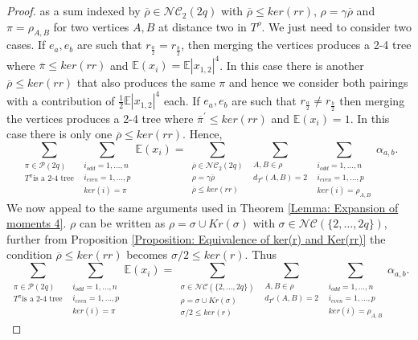 \documentclass{article}
\theoremstyle{definition}
\newcommand{\E}{\mathbb{E}}
\newcommand{\cP}{\mathcal{P}}
\newcommand{\NC}{\mathcal{NC}}
\begin{document}
{\begin{proof}
as a sum indexed by $\overline{\rho}\in \NC_2(2q)$ with $\overline{\rho}\leq ker(rr)$, $\rho=\gamma\overline{\rho}$ and $\pi=\rho_{A,B}$ for two vertices $A,B$ at distance two in $T^\rho$. We just need to consider two cases. If $e_a,e_b$ are such that $r_{\frac{a}{2}}=r_{\frac{b}{2}}$, then merging the vertices produces a 2-4 tree where $\overline{\pi}\leq ker(rr)$ and $\E(x_i)=\E|x_{1,2}|^4$. In this case there is another $\overline{\rho} \leq ker(rr)$ that also produces the same $\pi$ and hence we consider both pairings with a contribution of $\frac{1}{2}\E|x_{1,2}|^4$ each. If $e_a,e_b$ are such that $r_{\frac{a}{2}} \neq r_{\frac{b}{2}}$ then merging the vertices produces a 2-4 tree where $\overline{\pi}^\prime \leq ker(rr)$ and $\E(x_i)=1$. In this case there is only one $\overline{\rho} \leq ker(rr)$. Hence,
\begin{equation*}
\sum_{\substack{\pi\in \cP(2q)\\ T^\pi \text{is a 2-4 tree} }}\sum_{\substack{i_{odd}=1,\dots,n \\ i_{even}=1,\dots,p \\ ker(i)=\pi}}\E(x_i)= \sum_{\substack{\overline{\rho}\in \NC_2(2q) \\ \rho=\gamma\overline{\rho} \\ \overline{\rho}\leq ker(rr)}}\sum_{\substack{A,B\in\rho \\ d_{T^\rho}(A,B)=2}}\sum_{\substack{i_{odd}=1,\dots,n \\ i_{even}=1,\dots,p \\ ker(i)=\rho_{A,B}}}\alpha_{a,b}.
\end{equation*}
We now appeal to the same arguments used in Theorem \ref{Lemma: Expansion of moments 4}. $\rho$ can be written as $\rho=\sigma\cup Kr(\sigma)$ with $\sigma\in \NC(\{2,\dots,2q\})$, further from Proposition \ref{Proposition: Equivalence of ker(r) and Ker(rr)} the condition $\overline{\rho}\leq ker(rr)$ becomes $\sigma/2 \leq ker(r)$. Thus
\begin{equation}\label{Aux 8}
\sum_{\substack{\pi\in \cP(2q)\\ T^\pi \text{is a 2-4 tree} }}\sum_{\substack{i_{odd}=1,\dots,n \\ i_{even}=1,\dots,p \\ ker(i)=\pi}}\E(x_i)= \sum_{\substack{\sigma\in \NC(\{2,\dots,2q\}) \\ \rho=\sigma\cup Kr(\sigma) \\ \sigma/2\leq ker(r)}}\sum_{\substack{A,B\in\rho \\ d_{T^\rho}(A,B)=2}}\sum_{\substack{i_{odd}=1,\dots,n \\ i_{even}=1,\dots,p \\ ker(i)=\rho_{A,B}}}\alpha_{a,b}.

\end{equation}
\end{proof}}
\end{document}
